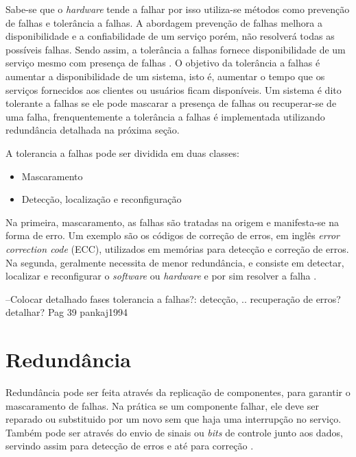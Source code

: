 Sabe-se que o \textit{hardware} tende a falhar por isso utiliza-se métodos como prevenção de falhas e tolerância a falhas.
A abordagem prevenção de falhas melhora a disponibilidade e a confiabilidade de um serviço porém, não resolverá todas as possíveis falhas.
Sendo assim, a tolerância a falhas fornece disponibilidade de um serviço mesmo com presença de falhas \cite{pankaj1994}.
O objetivo da tolerância a falhas é aumentar a disponibilidade de um sistema, isto é, aumentar o tempo que os serviços fornecidos aos 
clientes ou usuários ficam disponíveis. Um sistema é dito tolerante a falhas se ele pode mascarar a presença de falhas 
ou recuperar-se de uma falha, frenquentemente a tolerância a falhas é implementada utilizando redundância detalhada na próxima seção.

A tolerancia a falhas pode ser dividida em duas classes:
\begin{itemize}
 \item Mascaramento
 \item Detecção, localização e reconfiguração
\end{itemize}

Na primeira, mascaramento, as falhas são tratadas na origem e manifesta-se na forma de erro. Um exemplo são os 
códigos de correção de erros, em inglês \textit{error correction code} (ECC), utilizados em memórias para detecção e correção de erros.
Na segunda, geralmente necessita de menor redundância, e consiste em detectar, localizar e reconfigurar o \textit{software} ou
\textit{hardware} e por sim resolver a falha \cite{weber2002}.

--Colocar detalhado fases tolerancia a falhas?: detecção, .. recuperação de erros? detalhar? Pag 39 pankaj1994

\section{Redundância}

Redundância pode ser feita através da replicação de componentes, para garantir o mascaramento de falhas.
Na prática se um componente falhar, ele deve ser reparado ou substituido por um novo sem que haja uma interrupção no serviço.
Também pode ser através do envio de sinais ou \textit{bits} de controle junto aos dados, 
servindo assim para detecção de erros e até para correção \cite{weber2002}.

